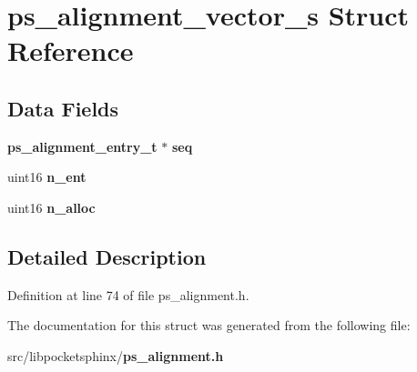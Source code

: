 \section{ps\+\_\+alignment\+\_\+vector\+\_\+s Struct Reference}
\label{structps__alignment__vector__s}
\subsection*{Data Fields}
\begin{DoxyCompactItemize}
\item 
{\bf ps\+\_\+alignment\+\_\+entry\+\_\+t} $\ast$ {\bfseries seq}\label{structps__alignment__vector__s_a5bfae302b7ca4bddde35600d157bc2a2}

\item 
uint16 {\bfseries n\+\_\+ent}\label{structps__alignment__vector__s_ac45b2f21982334d415bed78abfeba66d}

\item 
uint16 {\bfseries n\+\_\+alloc}\label{structps__alignment__vector__s_a18d4510d8a2495ac96bb0c295b725c83}

\end{DoxyCompactItemize}


\subsection{Detailed Description}


Definition at line 74 of file ps\+\_\+alignment.\+h.



The documentation for this struct was generated from the following file\+:\begin{DoxyCompactItemize}
\item 
src/libpocketsphinx/{\bf ps\+\_\+alignment.\+h}\end{DoxyCompactItemize}

